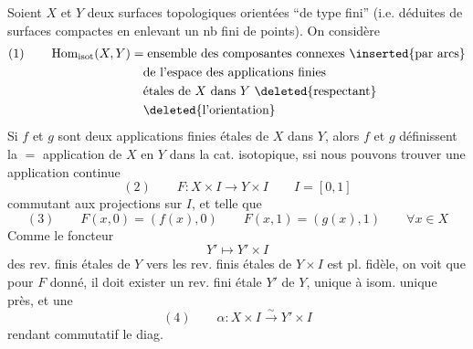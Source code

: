 Soient $X$ et $Y$ deux surfaces topologiques  orientées ``de type fini'' (i.e. déduites de surfaces compactes en enlevant un nb fini de points). On considère
\[
\begin{aligned}
(1)\qquad \operatorname{Hom}_{\mathrm{isot}}(X,Y)
&=\text{ensemble des composantes connexes \inserted{par arcs}}\\
&\quad\text{de l'espace des applications finies}\\
&\quad\text{étales de $X$ dans $Y$ \deleted{respectant}}\\
&\quad\deleted{\text{l'orientation}}
\end{aligned}
\]
Si $f$ et $g$ sont deux applications finies étales de $X$ dans $Y$, alors $f$ et $g$  définissent la $=$  application de $X$ en $Y$ dans la cat. isotopique, ssi nous pouvons trouver une application continue 
\[
(2)\qquad F:X\times I\longrightarrow Y\times I\qquad I=[0,1]
\]
commutant aux projections sur $I$, et telle que
\[
(3)\qquad F(x,0)=(f(x),0)\qquad F(x,1)=(g(x),1)\qquad\forall x\in X
\]
Comme le foncteur
\[
Y'\longmapsto Y'\times I
\]
des rev. finis étales de $Y$ vers les rev. finis étales de $Y\times I$ est pl. fidèle, on voit que  pour $F$ donné, il doit exister un rev. fini étale $Y'$ de $Y$, unique à isom. unique près, et une 
\[
(4)\qquad \alpha:X\times I\xrightarrow{\sim}Y'\times I
\]
rendant commutatif le diag. 
